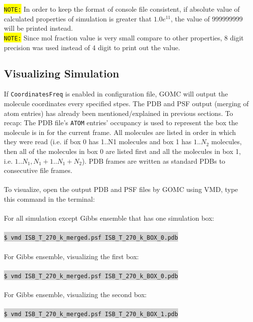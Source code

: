 \colorbox{yellow}{\texttt{NOTE:}} In order to keep the format of console file consistent, if absolute value of calculated properties of simulation is greater that $1.0 e^{11}$, the value of 999999999 will be printed instead.\\
\colorbox{yellow}{\texttt{NOTE:}} Since mol fraction value is very small compare to other properties, 8 digit precision was used instead of 4 digit to print out the value.\\

\subsection{Visualizing Simulation}
If \texttt{CoordinatesFreq} is enabled in configuration file, GOMC will output the molecule coordinates every specified stpes.
The PDB and PSF output (merging of atom entries) has already been mentioned/explained in previous sections.  To recap: The PDB file's \texttt{ATOM} entries' occupancy is used to represent the box the molecule is in for the current frame. All molecules are listed in order in which they were read (i.e. if box 0 has 1..N1 molecules and box 1 has $1..N_2$ molecules, then all of the molecules in box 0 are listed first and all the molecules in box 1, i.e. $1..N_1, N_1+1..N_1+N_2$).  PDB frames are written as standard PDBs to consecutive file frames.\\\\
To visualize, open the output PDB and PSF files by GOMC using VMD,  type this command in the terminal:\\\\
For all simulation except Gibbs ensemble that has one simulation box:\\\\
\colorbox{lightgray}{
\texttt{\$ vmd ISB\_T\_270\_k\_merged.psf  ISB\_T\_270\_k\_BOX\_0.pdb}
}\\\\

For Gibbs ensemble, visualizing the first box:\\\\
\colorbox{lightgray}{
\texttt{\$ vmd ISB\_T\_270\_k\_merged.psf  ISB\_T\_270\_k\_BOX\_0.pdb}
}\\\\
For Gibbs ensemble, visualizing the second box:\\\\
\colorbox{lightgray}{
\texttt{\$ vmd ISB\_T\_270\_k\_merged.psf  ISB\_T\_270\_k\_BOX\_1.pdb}
}\\\\

